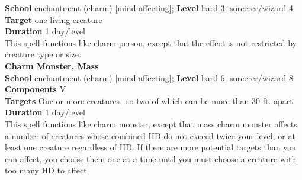 \textbf{School} enchantment (charm) [mind-affecting]; \textbf{Level} bard 3, sorcerer/wizard 4\\
\textbf{Target} one living creature\\
\textbf{Duration} 1 day/level\\
This spell functions like charm person, except that the effect is not restricted by creature type or size.\\
\textbf{Charm Monster, Mass}\\
\textbf{School} enchantment (charm) [mind-affecting]; \textbf{Level} bard 6, sorcerer/wizard 8\\
\textbf{Components} V\\
\textbf{Targets} One or more creatures, no two of which can be more than 30 ft. apart\\
\textbf{Duration} 1 day/level\\
This spell functions like charm monster, except that mass charm monster affects a number of creatures whose combined HD do not exceed twice your level, or at least one creature regardless of HD. If there are more potential targets than you can affect, you choose them one at a time until you must choose a creature with too many HD to affect.\\

